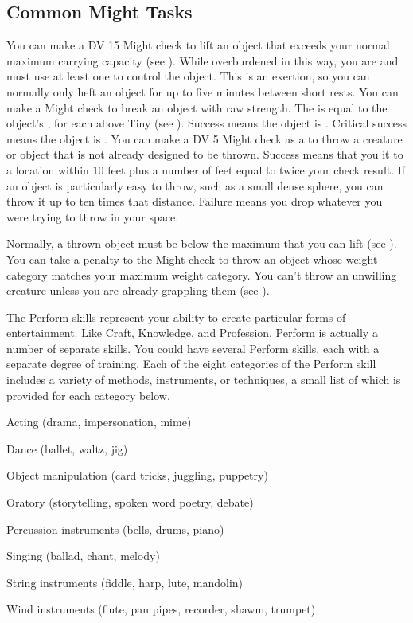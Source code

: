   \subsection{Common Might Tasks}
     You can make a DV 15 Might check to lift an object that exceeds your normal maximum carrying capacity (see ).
    While overburdened in this way, you are \unsteady and must use at least one  to control the object.
    This is an exertion, so you can normally only heft an object for up to five minutes between short rests.
     You can make a Might check to break an object with raw strength.
    The  is equal to the object's ,  for each  above Tiny (see ).
    Success means the object is .
    Critical success means the object is .
     You can make a DV 5 Might check as a  to throw a creature or object that is not already designed to be thrown.
    Success means that you  it to a location within 10 feet plus a number of feet equal to twice your check result.
    If an object is particularly easy to throw, such as a small dense sphere, you can throw it up to ten times that distance.
    Failure means you drop whatever you were trying to throw in your space.

    Normally, a thrown object must be below the maximum  that you can lift (see ).
    You can take a  penalty to the Might check to throw an object whose weight category matches your maximum weight category.
    You can't throw an unwilling creature unless you are already grappling them (see ).

\newpage
{}
  The Perform skills represent your ability to create particular forms of entertainment.
  Like Craft, Knowledge, and Profession, Perform is actually a number of separate skills.
  You could have several Perform skills, each with a separate degree of training.
  Each of the eight categories of the Perform skill includes a variety of methods, instruments, or techniques, a small list of which is provided for each category below.

  \begin{raggeditemize}
    \item Acting (drama, impersonation, mime)
    \item Dance (ballet, waltz, jig)
    \item Object manipulation (card tricks, juggling, puppetry)
    \item Oratory (storytelling, spoken word poetry, debate)
    \item Percussion instruments (bells, drums, piano)
    \item Singing (ballad, chant, melody)
    \item String instruments (fiddle, harp, lute, mandolin)
    \item Wind instruments (flute, pan pipes, recorder, shawm, trumpet)
  \end{raggeditemize}

